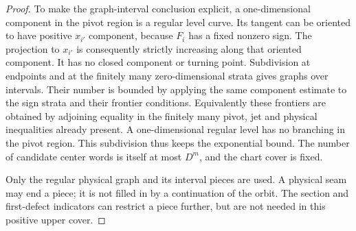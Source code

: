 \begin{proof}
To make the graph-interval conclusion explicit, a one-dimensional
component in the pivot region is a regular level curve. Its tangent
can be oriented to have positive $x_{i'}$ component, because $F_i$
has a fixed nonzero sign. The projection to $x_{i'}$ is consequently
strictly increasing along that oriented component. It has no closed
component or turning point. Subdivision at endpoints and at the
finitely many zero-dimensional strata gives graphs over intervals.
Their number is bounded by applying the same component estimate to
the sign strata and their frontier conditions. Equivalently these
frontiers are obtained by adjoining equality in the finitely many
pivot, jet and physical inequalities already present. A one-dimensional
regular level has no branching in the pivot region. This subdivision
thus keeps the exponential bound. The number of candidate center
words is itself at most $D^m$, and the chart cover is fixed.

Only the regular physical graph and its interval pieces are used.
A physical seam may end a piece; it is not filled in by a continuation
of the orbit. The section and first-defect indicators can restrict a
piece further, but are not needed in this positive upper cover.
\end{proof}

